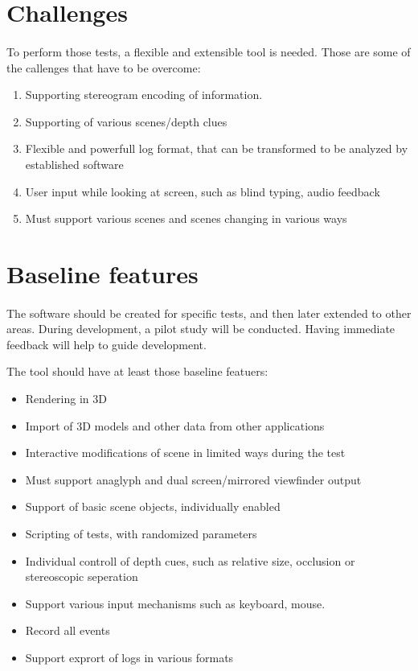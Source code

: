 \documentclass[11pt]{scrartcl}
\begin{document}
\begin{multicols}{2}
\section{Challenges}
\paragraph{}
To perform those tests, a flexible and extensible tool is needed. Those are some of the callenges that have to be overcome:

\begin{enumerate}
\item Supporting stereogram encoding of information.
\item Supporting of various scenes/depth clues
\item Flexible and powerfull log format, that can be transformed to be analyzed by established software
\item User input while looking at screen, such as blind typing, audio feedback
\item Must support various scenes and scenes changing in various ways
\end{enumerate}

\section{Baseline features}
\paragraph{}
The software should be created for specific tests, and then later extended to other areas. During development, a pilot study will be conducted. Having immediate feedback will help to guide development.

The tool should have at least those baseline featuers:

\begin{itemize}
\item Rendering in 3D
\item Import of 3D models and other data from other applications
\item Interactive modifications of scene in limited ways during the test
\item Must support anaglyph and dual screen/mirrored viewfinder output
\item Support of basic scene objects, individually enabled
\item Scripting of tests, with randomized parameters
\item Individual controll of depth cues, such as relative size, occlusion or stereoscopic seperation
\item Support various input mechanisms such as keyboard, mouse.
\item Record all events
\item Support exprort of logs in various formats
\end{itemize}


\end{multicols}
\end{document}
